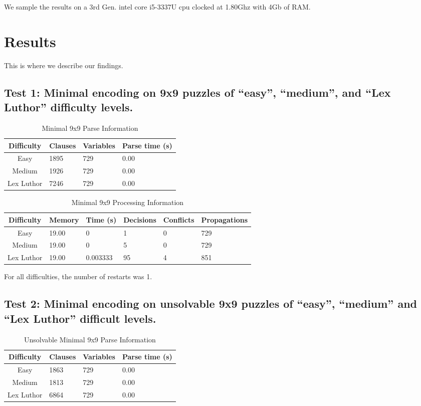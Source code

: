 \documentclass[conference,draftclsnofoot]{IEEEtran}
\begin{document}
We sample the results on a 3rd Gen. intel core i5-3337U cpu clocked at 1.80Ghz
with 4Gb of RAM.

\section{Results}
This is where we describe our findings.

\subsection{Test 1: Minimal encoding on 9x9 puzzles of ``easy'', ``medium'',
and ``Lex Luthor'' difficulty levels.}

\begin{table}[htbp]
	\centering
	\begin{tabular}{c | l l l}
		Difficulty & Clauses & Variables & Parse time (s) \\\hline
		Easy 		& 1895 & 729 & 0.00 \\
		Medium 		& 1926 & 729 & 0.00 \\
		Lex Luthor 	& 7246 & 729 & 0.00
	\end{tabular}
	\caption{Minimal 9x9 Parse Information}
	\label{tab:summary}
\end{table}

\begin{table}[!h]
	\centering
	\begin{tabular}{c | l l p{20pt} p{20pt} l}
		Difficulty & Memory & Time (s) & Decisions &
		Conflicts & Propagations \\\hline
		Easy 		& 19.00 & 0 		& 1  & 0 & 729\\
		Medium 		& 19.00 & 0 		& 5  & 0 & 729\\
		Lex Luthor 	& 19.00 & 0.003333 	& 95 & 4 & 851
	\end{tabular}
	\caption{Minimal 9x9 Processing Information}

	\label{tab:summary}
	For all difficulties, the number of restarts was 1.
\end{table}

\subsection{Test 2: Minimal encoding on unsolvable 9x9 puzzles of ``easy'',
``medium'' and ``Lex Luthor'' difficult levels.}

\begin{table}[!h]
	\centering
	\begin{tabular}{c | l l l}
		Difficulty & Clauses & Variables & Parse time (s) \\\hline
		Easy 		& 1863 & 729 & 0.00 \\
		Medium 		& 1813 & 729 & 0.00 \\
		Lex Luthor 	& 6864 & 729 & 0.00
	\end{tabular}
	\caption{Unsolvable Minimal 9x9 Parse Information}

	\label{tab:summary}
\end{table}
\end{document}
